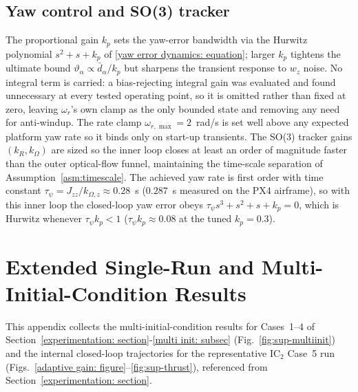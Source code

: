 \documentclass{IEEEtaes}
\theoremstyle{definition}
\theoremstyle{remark}
\begin{document}
\subsection{Yaw control and SO(3) tracker} The proportional gain $k_p$ sets the yaw-error bandwidth via the Hurwitz polynomial $s^2+s+k_p$ of \eqref{yaw error dynamics: equation}; larger $k_p$ tightens the ultimate bound $\vartheta_\alpha\propto\bar d_\alpha/k_p$ but sharpens the transient response to $w_z$ noise. No integral term is carried: a bias-rejecting integral gain was evaluated and found unnecessary at every tested operating point, so it is omitted rather than fixed at zero, leaving $\omega_r$'s own clamp as the only bounded state and removing any need for anti-windup. The rate clamp $\omega_{r,\max}=2$~rad/s is set well above any expected platform yaw rate so it binds only on start-up transients. The SO(3) tracker gains $(k_R, k_\Omega)$ are sized so the inner loop closes at least an order of magnitude faster than the outer optical-flow funnel, maintaining the time-scale separation of Assumption~\ref{asm:timescale}. The achieved yaw rate is first order with time constant $\tau_\psi=J_{zz}/k_{\Omega,z}\approx0.28$~s ($0.287$~s measured on the PX4 airframe), so with this inner loop the closed-loop yaw error obeys $\tau_\psi s^3+s^2+s+k_p=0$, which is Hurwitz whenever $\tau_\psi k_p<1$ ($\tau_\psi k_p\approx0.08$ at the tuned $k_p=0.3$).


\section{Extended Single-Run and Multi-Initial-Condition Results} \label{extended results appendix: section}
This appendix collects the multi-initial-condition results for Cases~1--4 of Section~\ref{experimentation: section}-\ref{multi init: subsec} (Fig.~\ref{fig:sup-multiinit}) and the internal closed-loop trajectories for the representative IC$_2$ Case~5 run (Figs.~\ref{adaptive gain: figure}--\ref{fig:sup-thrust}), referenced from Section~\ref{experimentation: section}.
\end{document}
